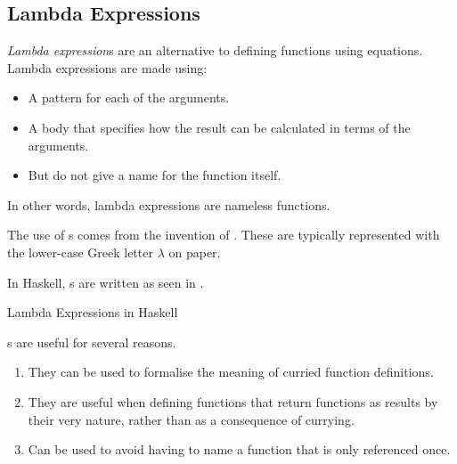 \subsection{Lambda Expressions}\label{subsec:Lambda_Expressions}
\begin{definition}\label{def:Lambda_Expression}
  \emph{Lambda expression}s are an alternative to defining functions using equations.
  Lambda expressions are made using:
  \begin{itemize}[noitemsep]
  \item A pattern for each of the arguments.
  \item A body that specifies how the result can be calculated in terms of the arguments.
  \item But do not give a name for the function itself.
  \end{itemize}

  In other words, lambda expressions are nameless functions.
\end{definition}

The use of s comes from the invention of .
These are typically represented with the lower-case Greek letter $\lambda$ on paper.

In Haskell, s are written as seen in .
\begin{listing}[h!tbp]
\caption{Lambda Expressions in Haskell}
\label{lst:Lambda_Expression}
\end{listing}

s are useful for several reasons.
\begin{enumerate}[noitemsep]
\item They can be used to formalise the meaning of curried function definitions.
\item They are useful when defining functions that return functions as results by their very nature, rather than as a consequence of currying.
\item Can be used to avoid having to name a function that is only referenced once.
\end{enumerate}

